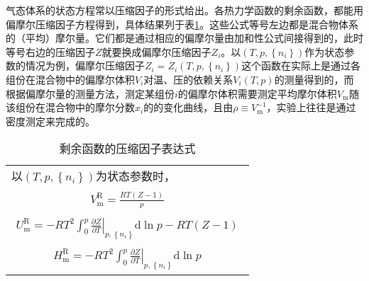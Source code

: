 \documentclass[main.tex]{subfiles}
\begin{document}
气态体系的状态方程常以压缩因子的形式给出。各热力学函数的剩余函数，都能用偏摩尔压缩因子方程得到，具体结果列于表\ref{tab:residule_functions_compressibility_factor}。这些公式等号左边都是混合物体系的（平均）摩尔量。它们都是通过相应的偏摩尔量由加和性公式间接得到的，此时等号右边的压缩因子$Z$就要换成偏摩尔压缩因子$Z_i$。以$\left(T,p,\left\{n_i\right\}\right)$作为状态参数的情况为例，偏摩尔压缩因子$Z_i=Z_i\left(T,p,\left\{n_i\right\}\right)$这个函数在实际上是通过各组份在混合物中的偏摩尔体积$V_i$对温、压的依赖关系$V_i\left(T,p\right)$的测量得到的，而根据偏摩尔量的测量方法，测定某组份$i$的偏摩尔体积需要测定平均摩尔体积$V_\text{m}$随该组份在混合物中的摩尔分数$x_i$的的变化曲线，且由$\rho\equiv V^{-1}_\text{m}$，实验上往往是通过密度测定来完成的。
\begin{longtable}{m{}}
    \caption{剩余函数的压缩因子表达式}                                   \label{tab:residule_functions_compressibility_factor}                                                                                                                                                  \\
    \hline
    以$\left(T,p,\left\{n_i\right\}\right)$为状态参数时，                                                                                                                                                                                                                   \\[-4ex]
    \begin{align}
        V_\text{m}^\text{R}=\frac{RT\left(Z-1\right)}{p}
    \end{align}                                                                                                                                                                                                                 \\[-8ex]
    \begin{align}
        U_\text{m}^\text{R}=-RT^2\int_0^p\left.\frac{\partial Z}{\partial T}\right|_{p,\left\{n_i\right\}}\mathrm{d}\ln p-RT\left(Z-1\right)
    \end{align}                                                                                                                             \\[-8ex]
    \begin{align}H_\text{m}^\text{R}=-RT^2\int_0^p\left.\frac{\partial Z}{\partial T}\right|_{p,\left\{n_i\right\}}\mathrm{d}\ln p\end{align}                                                                                                                       \\[-8ex]

\end{longtable}
\end{document}
